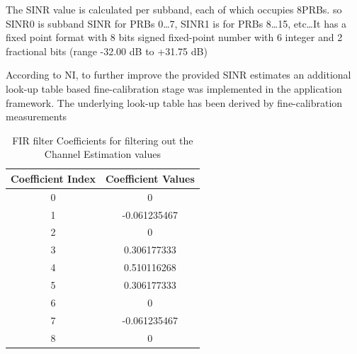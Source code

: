 The SINR value is calculated per subband, each of which occupies 8PRBs. so SINR0 is subband SINR for PRBs 0\ldots7, SINR1 is for PRBs 8\ldots15, etc\ldots It has a fixed point format with 8 bits signed fixed-point number with 6 integer and 2 fractional bits (range -32.00 \si{\dB} to +31.75 \si{\dB})

According to NI, to further improve the provided SINR estimates an additional look-up table based fine-calibration stage was implemented in the application framework. The underlying look-up table has been derived by fine-calibration measurements

\begin{table}[H]
    \begin{center}
        \begin{tabular}{|c|c|}
            \hline
            \textbf{Coefficient Index} & \textbf{Coefficient Values} \\ \hline
            0                          & 0                           \\ \hline
            1                          & -0.061235467                \\ \hline
            2                          & 0                           \\ \hline
            3                          & 0.306177333                 \\ \hline
            4                          & 0.510116268                 \\ \hline
            5                          & 0.306177333                 \\ \hline
            6                          & 0                           \\ \hline
            7                          & -0.061235467                \\ \hline
            8                          & 0                           \\ \hline
        \end{tabular}
    \end{center}
    \caption{FIR filter Coefficients for filtering out the Channel Estimation values}
    \label{tab:LPFCoeff}
\end{table}


